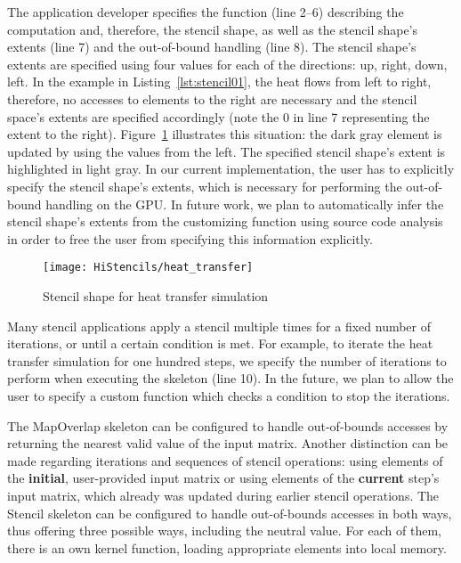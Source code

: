 The application developer specifies the function (line 2--6) describing the computation and, therefore, the stencil shape, as well as the stencil shape's extents (line 7) and the out-of-bound handling (line 8).
The stencil shape's extents are specified using four values for each of the directions:
up, right, down, left.
In the example in Listing~\ref{lst:stencil01}, the heat flows from left to right, therefore, no accesses to elements to the right are necessary and the stencil space's extents are specified accordingly (note the $0$ in line 7 representing the extent to the right).
Figure~\ref{fig:stencilShape} illustrates this situation: the dark gray element is updated by using the values from the left.
The specified stencil shape's extent is highlighted in light gray.
In our current implementation, the user has to explicitly specify the stencil shape's extents, which is necessary for performing the out-of-bound handling on the GPU.
In future work, we plan to automatically infer the stencil shape's extents
from the customizing function using source code analysis in order to free the user from specifying this information explicitly.
\begin{figure}
  \begin{centering}
    \texttt{[image: HiStencils/heat\_transfer]}
    \caption{Stencil shape for heat transfer simulation}
    \label{fig:stencilShape}
    \vspace{-.5em}
  \end{centering}
\end{figure}

Many stencil applications apply a stencil multiple times for a fixed number of iterations, or until a certain condition is met.
For example, to iterate the heat transfer simulation for one hundred steps, we specify the number of iterations to perform when executing the skeleton (line 10).
In the future, we plan to allow the user to specify a custom function which checks a condition to stop the iterations.

The MapOverlap skeleton can be configured to handle out-of-bounds accesses by returning the nearest valid value of the input matrix.
Another distinction can be made regarding iterations and sequences of stencil operations:
using elements of the \textbf{initial}, user-provided input matrix or using elements of the \textbf{current} step's input matrix, which already was updated during earlier stencil operations.
The Stencil skeleton can be configured to handle out-of-bounds accesses in both ways, thus offering three possible ways, including the neutral value. 
For each of them, there is an own kernel function, loading appropriate elements into local memory. 

